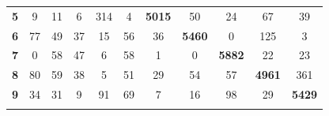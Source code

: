 \documentclass[
	12pt,				%
	openright,			%
	twoside,			%
	a4paper,			%
	english,			%
	brazil,				%
	svgnames
	]{abntex2}\usepackage[]{graphicx}\usepackage[]{color}
\begin{document}
\begin{table}[h]
\begin{tabular}{rcccccccccc}
\multicolumn{1}{r|}{\textbf{5}}          & 9                                  & 11                                 & 6                                  & 314                                & \multicolumn{1}{c|}{4}             & \multicolumn{1}{c|}{\textbf{5015}} & 50                                 & 24                                 & 67                                 & 39                                 \\ \cline{7-8}
\multicolumn{1}{r|}{\textbf{6}}          & 77                                 & 49                                 & 37                                 & 15                                 & 56                                 & \multicolumn{1}{c|}{36}            & \multicolumn{1}{c|}{\textbf{5460}} & 0                                  & 125                                & 3                                  \\ \cline{8-9}
\multicolumn{1}{r|}{\textbf{7}}          & 0                                  & 58                                 & 47                                 & 6                                  & 58                                 & 1                                  & \multicolumn{1}{c|}{0}             & \multicolumn{1}{c|}{\textbf{5882}} & 22                                 & 23                                 \\ \cline{9-10}
\multicolumn{1}{r|}{\textbf{8}}          & 80                                 & 59                                 & 38                                 & 5                                  & 51                                 & 29                                 & 54                                 & \multicolumn{1}{c|}{57}            & \multicolumn{1}{c|}{\textbf{4961}} & 361                                \\ \cline{10-11} 
\multicolumn{1}{r|}{\textbf{9}}          & 34                                 & 31                                 & 9                                  & 91                                 & 69                                 & 7                                  & 16                                 & 98                                 & \multicolumn{1}{c|}{29}            & \multicolumn{1}{c|}{\textbf{5429}} \\ \hline
\textbf{}                                &                                    &                                    &                                    &                                    &                                    &                                    &                                    &                                    &                                    &                                    \\ \hline

\end{tabular}
\end{table}
\end{document}

